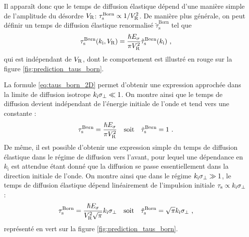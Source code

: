 Il apparaît donc que le temps de diffusion élastique dépend d'une manière simple de l'amplitude du désordre $V_{\mathrm{R}}$: $\tau_{\mathrm{s}}^{\mathrm{Born}} \propto 1/V_{\mathrm{R}}^2$. De manière plus générale, on peut définir un temps de diffusion élastique renormalisé $\tilde{\tau}_{\mathrm{s}}^{\mathrm{Born}}$ tel que
\begin{equation}
\tau_{\mathrm{s}}^{\mathrm{Born}} (k_{\mathrm{i}},V_{\mathrm{R}})=\frac{\hslash E_{\sigma}}{\pi V_{\mathrm{R}}^2} \tilde{\tau}_{\mathrm{s}}^{\mathrm{Born}} (k_{\mathrm{i}}) \text{ ,}
\end{equation}
qui est indépendant de $V_{\mathrm{R}}$, dont le comportement est illustré en rouge sur la figure \ref{fig:prediction_taus_born}.

La formule \ref{eq:taus_born_2D} permet d'obtenir une expression approchée dans la limite de diffusion isotrope $k_{\mathrm{i}}\sigma_{\perp}\ll 1$. On montre ainsi que le temps de diffusion devient indépendant de l'énergie initiale de l'onde et tend vers une constante \citep{richard2015propagation}:
\begin{equation}
\tau_{\mathrm{s}}^{\mathrm{Born}} = \frac{\hslash E_{\sigma}}{\pi V_{\mathrm{R}}^2}\quad \text{soit} \quad \tilde{\tau}_{\mathrm{s}}^{\mathrm{Born}}=1 \text{ .}
\end{equation}
De même, il est possible d'obtenir une expression simple du temps de diffusion élastique dans le régime de diffusion vers l'avant, pour lequel une dépendance en $k_{\mathrm{i}}$ est attendue étant donné que la diffusion se passe essentiellement dans la direction initiale de l'onde. On montre ainsi que dans le régime $k_{\mathrm{i}} \sigma_{\perp} \gg 1$, le temps de diffusion élastique  dépend linéairement de l'impulsion initiale $\tau_{\mathrm{s}}\propto k_{\mathrm{i}}\sigma_{\perp}$ \citep{richard2015propagation}:
\begin{equation}
\tau_{\mathrm{s}}^{\mathrm{Born}}=\frac{\hslash E_{\sigma}}{V_{\mathrm{R}}^2\sqrt{\pi}} k_{\mathrm{i}} \sigma_{\perp} \quad \text{soit} \quad \tilde{\tau}_{\mathrm{s}}^{\mathrm{Born}} = \sqrt{\pi} k_{\mathrm{i}} \sigma_{\perp} \text{ ,}
\end{equation}
représenté en vert sur la figure \ref{fig:prediction_taus_born}.

